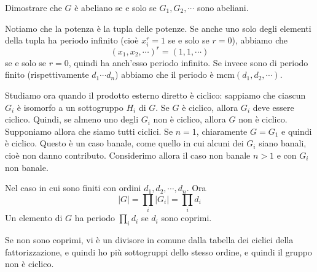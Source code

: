 \documentclass[a4paper]{article}
\begin{document}
Dimostrare che \(G\) è abeliano se e solo se \(G_1, G_2, \cdots\) sono abeliani.

Notiamo che la potenza è la tupla delle potenze.
Se anche uno solo degli elementi della tupla ha periodo infinito
(cioè \(x_i^r = 1\) se e solo se \(r=0\)), abbiamo che
\[
    {(x_1, x_2, \cdots)}^r = (1,1,\cdots)
\]
se e solo se \(r=0\), quindi ha anch'esso periodo infinito.
Se invece sono di periodo finito (rispettivamente \(d_1\cdots d_n\))
abbiamo che il periodo è \(\text{mcm}(d_1, d_2, \cdots)\).

Studiamo ora quando il prodotto esterno diretto è ciclico:
sappiamo che ciascun \(G_i\) è isomorfo a un sottogruppo \(H_i\) di \(G\).
Se \(G\) è ciclico, allora \(G_i\) deve essere ciclico.
Quindi, se almeno uno degli \(G_i\) non è ciclico, allora \(G\)
non è ciclico. Supponiamo allora che siamo tutti ciclici.
Se \(n=1\), chiaramente \(G=G_1\) e quindi è ciclico.
Questo è un caso banale, come quello in cui alcuni dei \(G_i\)
siano banali, cioè non danno contributo.
Considerimo allora il caso non banale \(n>1\) e con \(G_i\) non banale.



Nel caso in cui sono finiti con ordini \(d_1, d_2, \cdots, d_n\).
Ora \[
    |G| = \prod_i |G_i| = \prod_i d_i
\]
Un elemento di \(G\) ha periodo \(\prod_i d_i\)
se \(d_i\) sono coprimi.

Se non sono coprimi, vi è un divisore in comune dalla tabella dei ciclici della fattorizzazione,
e quindi ho più sottogruppi dello stesso ordine, e quindi il gruppo non è ciclico.

\end{document}
